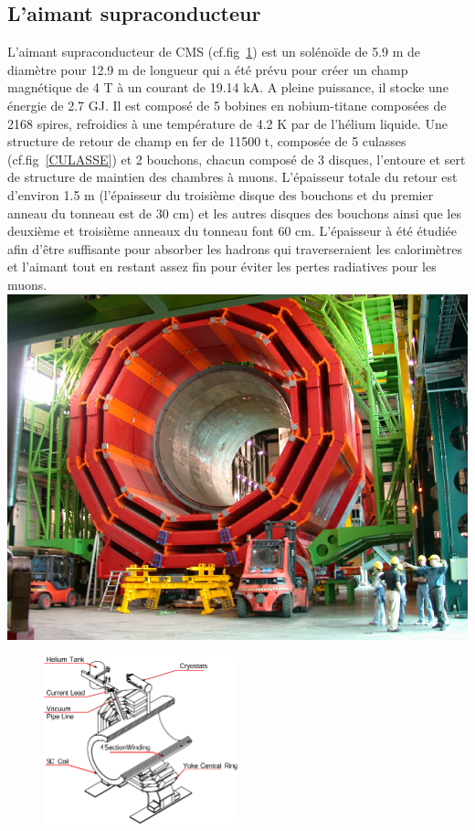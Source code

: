 \subsection{L'aimant supraconducteur}
L'aimant supraconducteur de CMS (cf.fig~\ref{MAGNET}) est un solénoïde de 5.9 m de diamètre pour 12.9 m de longueur qui a été prévu pour créer un champ magnétique de 4 T à un courant de 19.14 kA. A pleine puissance, il stocke une énergie de 2.7 GJ. Il est composé de 5 bobines en nobium-titane composées de 2168 spires, refroidies à une température de 4.2 K par de l'hélium liquide. Une structure de retour de champ en fer de 11500 t, composée de 5 culasses (cf.fig~\ref{CULASSE}) et 2 bouchons, chacun composé de 3 disques, l'entoure et sert de structure de maintien des chambres à muons. L'épaisseur totale du retour est d'environ 1.5 m (l'épaisseur du troisième disque des bouchons et du premier anneau du tonneau est de 30 cm) et les autres disques des bouchons ainsi que les deuxième et troisième anneaux du tonneau font 60 cm. L'épaisseur à été étudiée afin d'être suffisante pour absorber les hadrons qui traverseraient les calorimètres et l'aimant tout en restant assez fin pour éviter les pertes radiatives pour les muons.
\marginpar
{
	\centering
	\includegraphics[width=\marginparwidth]{CMS/CULASSE.jpg}
	\label{CULASSE}
}
\begin{figure}[ht!]
	\centering
	\includegraphics[width=0.50\textwidth]{CMS/MAGNET.png}
	\label{MAGNET}
\end{figure}
